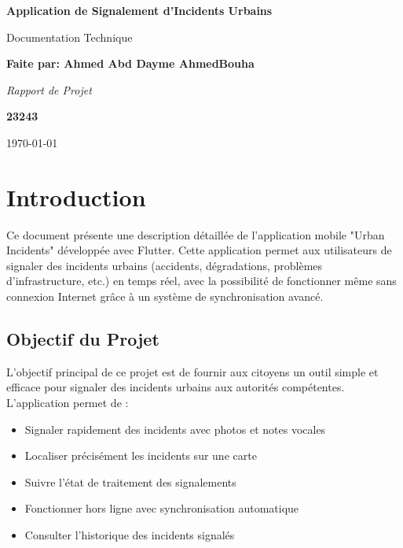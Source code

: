 \documentclass[12pt,a4paper]{article}
\begin{document}
\begin{titlepage}
    \centering
    \vspace*{2cm}
    {\Huge\bfseries Application de Signalement d'Incidents Urbains\par}
    \vspace{1.5cm}
    {\Large Documentation Technique\par}
    \vspace{2cm}
    {\Huge\bfseries  Faite par: Ahmed Abd Dayme AhmedBouha \par}
    \vspace{2cm}
    {\Large\itshape Rapport de Projet\par}
     \vspace{2cm}
    {\Huge\bfseries 23243  \par}
    \vspace{2cm}
    \vfill
    {\large \today\par}
\end{titlepage}

\tableofcontents
\newpage

\section{Introduction}

Ce document présente une description détaillée de l'application mobile "Urban Incidents" développée avec Flutter. Cette application permet aux utilisateurs de signaler des incidents urbains (accidents, dégradations, problèmes d'infrastructure, etc.) en temps réel, avec la possibilité de fonctionner même sans connexion Internet grâce à un système de synchronisation avancé.

\subsection{Objectif du Projet}

L'objectif principal de ce projet est de fournir aux citoyens un outil simple et efficace pour signaler des incidents urbains aux autorités compétentes. L'application permet de :

\begin{itemize}
    \item Signaler rapidement des incidents avec photos et notes vocales
    \item Localiser précisément les incidents sur une carte
    \item Suivre l'état de traitement des signalements
    \item Fonctionner hors ligne avec synchronisation automatique
    \item Consulter l'historique des incidents signalés
\end{itemize}
\end{document}
